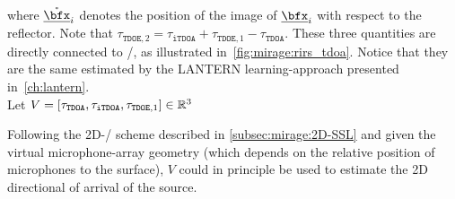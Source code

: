 where $\mathring{\positionMicrophone}_i$ denotes the position of the image of $\positionMicrophone_i$ with respect to the reflector.
Note that $\tau_{\mathtt{TDOE},2} = \tau_\mathtt{iTDOA} + \tau_{\mathtt{TDOE}, 1} - \tau_\mathtt{TDOA}$.
These three quantities are directly connected to \RIRs/, as illustrated in~\cref{fig:mirage:rirs_tdoa}.
Notice that they are the same estimated by the \ac{LANTERN} learning-approach presented in~\cref{ch:lantern}.
\\Let $V = \klist{\tau_{\mathtt{TDOA}}, \tau_{\mathtt{iTDOA}}, \tau_{\mathtt{TDOE},1}}\in\mathbb{R}^3$


\mynewline
Following the 2D-\SSL/ scheme described in \cref{subsec:mirage:2D-SSL} and given the virtual microphone-array geometry (which depends on the relative position of microphones to the surface),
$V$ could in principle be used to estimate the 2D directional of arrival of the source.

